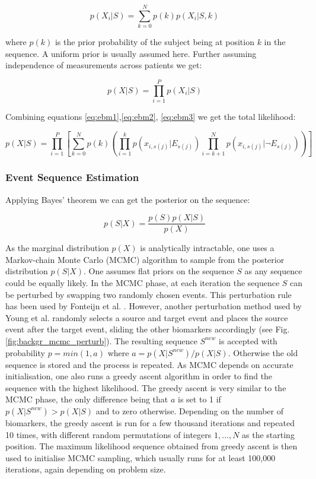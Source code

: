 \begin{equation}
\label{eq:ebm2}
  p(X_i | S) = \sum_{k=0}^N p(k)p(X_i|S,k) 
\end{equation}

where $p(k)$ is the prior probability of the subject being at position $k$ in the sequence. A uniform prior is usually assumed here. Further assuming independence of measurements across patients we get:

\begin{equation}
\label{eq:ebm3}
 p(X|S) = \prod_{i=1}^P p(X_i | S)
\end{equation}

Combining equations \ref{eq:ebm1},\ref{eq:ebm2}, \ref{eq:ebm3} we get the total likelihood:

\begin{equation}
\label{eq:ebm4}
 p(X|S) = \prod_{i=1}^P \left[ \sum_{k=0}^N p(k) \left( \prod_{i=1}^k p\left(x_{i,s(j)} | E_{s(j)} \right) \prod_{i=k+1}^N p\left(x_{i,s(j)} | \neg E_{s(j)}\right) \right) \right]
\end{equation}

\subsubsection{Event Sequence Estimation}
\label{sec:model_est}

Applying Bayes' theorem  we can get the posterior on the sequence:

\begin{equation}
 p(S|X) = \frac{p(S)p(X|S)}{p(X)}
\end{equation}

As the marginal distribution $p(X)$ is analytically intractable, one uses a Markov-chain Monte Carlo (MCMC) algorithm to sample from the posterior distribution $p(S|X)$. One assumes flat priors on the sequence $S$ as any sequence could be equally likely. In the MCMC phase, at each iteration the sequence $S$ can be perturbed by swapping two randomly chosen events. This perturbation rule has been used by Fonteijn et al. \cite{fonteijn2012event}. However, another perturbation method used by Young et al. \cite{young2014data} randomly selects a source and target event and places the source event after the target event, sliding the other biomarkers accordingly (see Fig. \ref{fig:backgr_mcmc_perturb}). The resulting sequence $S^{new}$ is accepted with probability $p = min(1, a)$ where $ a = p(X|S^{new})/p(X|S)$. Otherwise the old sequence is stored and the process is repeated. As MCMC depends on accurate initialisation, one also runs a greedy ascent algorithm in order to find the sequence with the highest likelihood. The greedy ascent is very similar to the MCMC phase, the only difference being that $a$ is set to 1 if $p(X|S^{new}) > p(X|S)$ and to zero otherwise. Depending on the number of biomarkers, the greedy ascent is run for a few thousand iterations and repeated 10 times, with different random permutations of integers $1,\dots,N$ as the starting position. The maximum likelihood sequence obtained from greedy ascent is then used to initialise MCMC sampling, which usually runs for at least 100,000 iterations, again depending on problem size.

